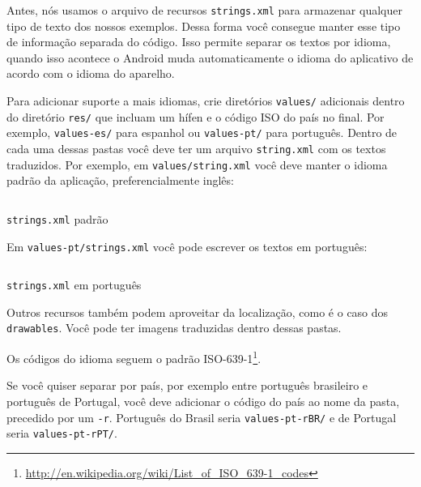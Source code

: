 \documentclass[a4paper,12pt,brazil,oneside]{book}
\begin{document}
\begin{singlespace}
	Antes, nós usamos o arquivo de recursos \texttt{strings.xml} para armazenar qualquer tipo de texto dos nossos exemplos. Dessa forma você consegue manter esse tipo de informação separada do código. Isso permite separar os textos por idioma, quando isso acontece o Android muda automaticamente o idioma do aplicativo de acordo com o idioma do aparelho.
	
	Para adicionar suporte a mais idiomas, crie diretórios \texttt{values/} adicionais dentro do diretório \texttt{res/} que incluam um hífen e o código ISO do país no final. Por exemplo, \texttt{values-es/} para espanhol ou \texttt{values-pt/} para português. Dentro de cada uma dessas pastas você deve ter um arquivo \texttt{string.xml} com os textos traduzidos. Por exemplo, em \texttt{values/string.xml} você deve manter o idioma padrão da aplicação, preferencialmente inglês:

	\begin{listing}[H]
	\inputminted[linenos=true,fontsize=\small,frame=lines, framesep=2mm, tabsize=2,numbersep=5pt]{xml}{src/api/locale/string-en.xml}
	\caption{\texttt{strings.xml} padrão}
	\label{code:locale-strings}
	\end{listing} 	

	Em \texttt{values-pt/strings.xml} você pode escrever os textos em português:

	\begin{listing}[H]
	\inputminted[linenos=true,fontsize=\small,frame=lines, framesep=2mm, tabsize=2,numbersep=5pt]{xml}{src/api/locale/string-pt.xml}
	\caption{\texttt{strings.xml} em português}
	\label{code:locale-strings-pt}
	\end{listing} 	

	Outros recursos também podem aproveitar da localização, como é o caso dos \texttt{drawables}. Você pode ter imagens traduzidas dentro dessas pastas.

	Os códigos do idioma seguem o padrão ISO-639-1\footnote{\href{http://en.wikipedia.org/wiki/List\_of\_ISO\_639-1\_codes}{http://en.wikipedia.org/wiki/List\_of\_ISO\_639-1\_codes}}.

	Se você quiser separar por país, por exemplo entre português brasileiro e português de Portugal, você deve adicionar o código do país ao nome da pasta, precedido por um \texttt{-r}. Português do Brasil seria \texttt{values-pt-rBR/} e de Portugal seria \texttt{values-pt-rPT/}.


\end{singlespace}

\singlespace
{}
\cleardoublepage
\thispagestyle{empty}
{}


\doublespace
\end{document}
